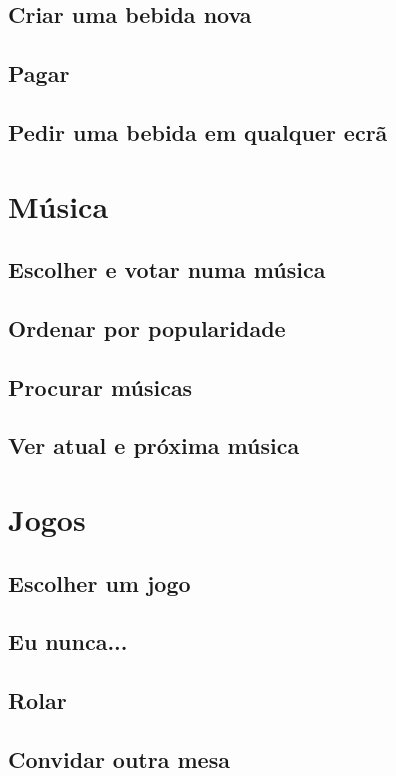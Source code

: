 \documentclass{article}
\begin{document}
\subsection{Criar uma bebida nova}
\subsection{Pagar}
\subsection{Pedir uma bebida em qualquer ecrã}
\section{Música}
\subsection{Escolher e votar numa música}
\subsection{Ordenar por popularidade}
\subsection{Procurar músicas}
\subsection{Ver atual e próxima música}
\section{Jogos}
\subsection{Escolher um jogo}
\subsection{Eu nunca...}
\subsection{Rolar}
\subsection{Convidar outra mesa}
\end{document}
